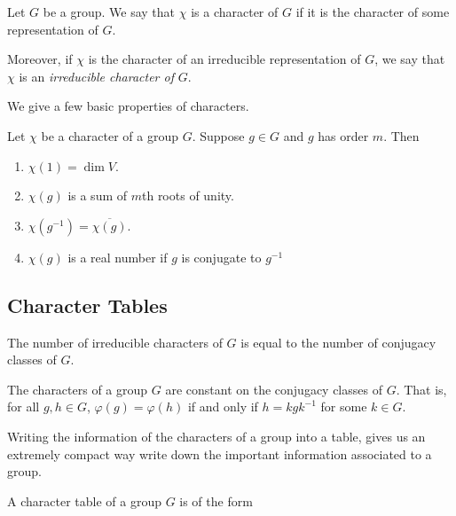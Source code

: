 \begin{definition}
    Let $G$ be a group. We say that $\chi$ is a character of $G$ if it is the character of some representation of 
    $G$.

    Moreover, if $\chi$ is the character of an irreducible representation of $G$, we say that $\chi$ is an
    \emph{irreducible character of} $G$.
\end{definition}



We give a few basic properties of characters.
\begin{theorem}
    Let $\chi$ be a character of a group $G$. Suppose $g \in G$ and $g$ has order $m$. Then
    \begin{enumerate}
        \item $\chi(1) = \dim V$.
        \item $\chi(g)$ is a sum of $m$th roots of unity.
        \item $\chi(g^{-1}) = \overline{\chi(g)}$.
        \item $\chi(g)$ is a real number if $g$ is conjugate  to $g^{-1}$
    \end{enumerate}
\end{theorem}




\subsection{Character Tables}
    


\begin{theorem}
    The number of irreducible characters of $G$ is equal to the number of conjugacy classes of $G$.
\end{theorem}

\begin{theorem}
    The characters of a group $G$ are constant on the conjugacy classes of $G$. That is, for all $g,h \in G$, 
    $\varphi(g) = \varphi(h)$ if and only if $h = kgk^{-1}$ for some $k \in G$.
\end{theorem}


    Writing the information of the characters of a group into a table, gives us an extremely compact way write down 
    the important information associated to a group.
    

\begin{definition}
    A character table of a group $G$ is of the form 
    

\end{definition}



